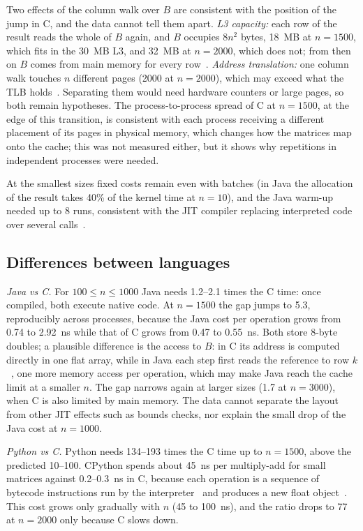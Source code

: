 \documentclass[12pt,a4paper]{article}
\begin{document}
Two effects of the column walk over $B$ are consistent with the position of the jump in
C, and the data cannot tell them apart. \textit{L3 capacity:} each row of the result
reads the whole of $B$ again, and $B$ occupies $8n^2$ bytes, 18~MB at $n = 1500$, which
fits in the 30~MB L3, and 32~MB at $n = 2000$, which does not; from then on $B$ comes from
main memory for every row~\cite{hennessy2019}. \textit{Address translation:} one column
walk touches $n$ different pages (2000 at $n = 2000$), which may exceed what the TLB
holds~\cite{hennessy2019}. Separating them would need hardware counters or large pages,
so both remain hypotheses. The process-to-process spread of C at $n = 1500$, at the edge
of this transition, is consistent with each process receiving a different placement of
its pages in physical memory, which changes how the matrices map onto the cache; this was
not measured either, but it shows why repetitions in independent processes were needed.

At the smallest sizes fixed costs remain even with batches (in Java the allocation of
the result takes 40\% of the kernel time at $n = 10$), and the Java warm-up needed up to
8 runs, consistent with the JIT compiler replacing interpreted code over several
calls~\cite{oraclejvm}.

\subsection{Differences between languages}

\textit{Java vs C.} For $100 \le n \le 1000$ Java needs 1.2--2.1 times the C time: once
compiled, both execute native code. At $n = 1500$ the gap jumps to 5.3, reproducibly
across processes, because the Java cost per operation grows from 0.74 to 2.92~ns while
that of C grows from 0.47 to 0.55~ns. Both store 8-byte doubles; a plausible difference
is the access to $B$: in C its address is computed directly in one flat array, while in
Java each step first reads the reference to row $k$~\cite{jls21}, one more memory access
per operation, which may make Java reach the cache limit at a smaller $n$. The gap
narrows again at larger sizes (1.7 at $n = 3000$), when C is also limited by main memory.
The data cannot separate the layout from other JIT effects such as bounds checks, nor
explain the small drop of the Java cost at $n = 1000$.

\textit{Python vs C.} Python needs 134--193 times the C time up to $n = 1500$, above the
predicted 10--100. CPython spends about 45~ns per multiply-add for small matrices against
0.2--0.3~ns in C, because each operation is a sequence of bytecode instructions run by
the interpreter~\cite{pydis} and produces a new float object~\cite{pydatamodel}. This
cost grows only gradually with $n$ (45 to 100~ns), and the ratio drops to 77 at
$n = 2000$ only because C slows down.
\end{document}
